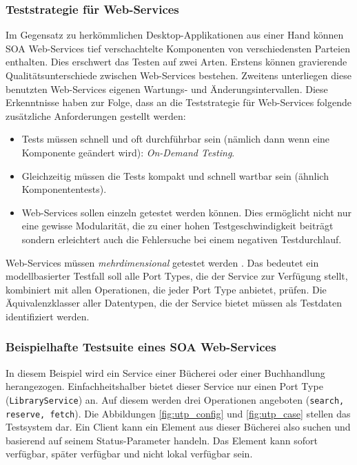 \subsubsection{Teststrategie für Web-Services}
Im Gegensatz zu herkömmlichen Desktop-Applikationen aus einer Hand können SOA Web-Services tief verschachtelte Komponenten von verschiedensten Parteien enthalten. Dies erschwert das Testen auf zwei Arten. Erstens können gravierende Qualitätsunterschiede zwischen Web-Services bestehen. Zweitens unterliegen diese benutzten Web-Services eigenen Wartungs- und Änderungsintervallen. Diese Erkenntnisse haben zur Folge, dass an die Teststrategie für Web-Services folgende zusätzliche Anforderungen gestellt werden:

\begin{itemize}
\item Tests müssen schnell und oft durchführbar sein (nämlich dann wenn eine Komponente geändert wird): \textit{On-Demand Testing}.
\item Gleichzeitig müssen die Tests kompakt und schnell wartbar sein (ähnlich Komponententests).
\item Web-Services sollen einzeln getestet werden können. Dies ermöglicht nicht nur eine gewisse Modularität, die zu einer hohen Testgeschwindigkeit beiträgt sondern erleichtert auch die Fehlersuche bei einem negativen Testdurchlauf.
\end{itemize}

Web-Services müssen \textit{mehrdimensional} getestet werden \cite{_model-driven_2007}. Das bedeutet ein modellbasierter Testfall soll alle Port Types, die der Service zur Verfügung stellt, kombiniert mit allen Operationen, die jeder Port Type anbietet, prüfen. Die Äquivalenzklasser aller Datentypen, die der Service bietet müssen als Testdaten identifiziert werden. 

\subsubsection{Beispielhafte Testsuite eines SOA Web-Services}
In diesem Beispiel wird ein Service einer Bücherei oder einer Buchhandlung herangezogen. Einfachheitshalber bietet dieser Service nur einen Port Type (\texttt{LibraryService}) an. Auf diesem werden drei Operationen angeboten (\texttt{search, reserve, fetch}). Die Abbildungen \ref{fig:utp_config} und \ref{fig:utp_case} stellen das Testsystem dar. Ein Client kann ein Element aus dieser Bücherei also suchen und basierend auf seinem Status-Parameter handeln. Das Element kann sofort verfügbar, später verfügbar und nicht lokal verfügbar sein.\\

